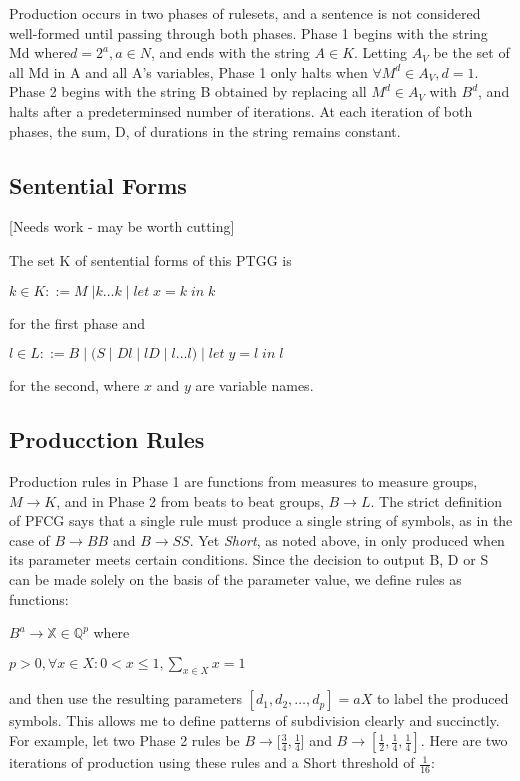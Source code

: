 \documentclass{article}
\begin{document}
Production occurs in two phases of rulesets, and a sentence is not considered well-formed until passing through both phases. Phase 1 begins with the string Md where$ d=2^a, a \in N$, and ends with the string $A \in K$. Letting $A_V$ be the set of all Md in A and all A’s variables, Phase 1 only halts when $\forall M^d \in A_V, d=1$. Phase 2 begins with the string B obtained by replacing all $M^d \in A_V$ with $B^d$, and halts after a predeterminsed number of iterations. At each iteration of both phases, the sum, D, of durations in the string remains constant.

\subsection{Sentential Forms}

[Needs work - may be worth cutting]

The set K of sentential forms of this PTGG is %

$k \in K ::= M \; | k…k \; | \;  let \; x=k \; in \; k$

\noindent for the first phase and 

$l \in L ::= B \; | \; ( S \; | \; Dl \; | \;  lD \; | \; l…l ) \; | \;  let \; y=l \; in\;  l$

\noindent for the second, where $x$ and $y$ are variable names.

\subsection{Producction Rules}

Production rules in Phase 1 are functions from measures to measure groups, $M \rightarrow K$, and in Phase 2 from beats to beat groups, $B \rightarrow L$. The strict definition of PFCG says that a single rule must produce a single string of symbols, as in the case of $B \rightarrow BB$ and $B \rightarrow SS$.  Yet \emph{Short}, as noted above, in only produced when its parameter meets certain conditions. Since the decision to output B, D or S can be made solely on the basis of the parameter value, we define rules as functions:

$B^a \rightarrow \mathbb{X} \in \mathbb{Q}^{p}$ where 

$p > 0 , \forall x \in X: 0 < x \leq 1, \sum_{x \in X} x = 1$

and then use the resulting parameters $[d_1,d_2,…,d_p]=aX$ to label the produced symbols. This allows me to define patterns of subdivision clearly and succinctly. For example, let two Phase 2 rules be $B \rightarrow [\frac{3}{4}, \frac{1}{4}$] and $B \rightarrow [\frac{1}{2}, \frac{1}{4}, \frac{1}{4}]$. Here are two iterations of production using these rules and a Short threshold of $\frac{1}{16}$:
\end{document}

